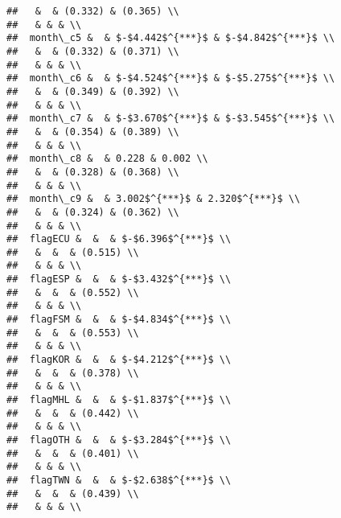 \documentclass[11pt,]{article}
\begin{document}
\begin{verbatim}
##   &  & (0.332) & (0.365) \\ 
##   & & & \\ 
##  month\_c5 &  & $-$4.442$^{***}$ & $-$4.842$^{***}$ \\ 
##   &  & (0.332) & (0.371) \\ 
##   & & & \\ 
##  month\_c6 &  & $-$4.524$^{***}$ & $-$5.275$^{***}$ \\ 
##   &  & (0.349) & (0.392) \\ 
##   & & & \\ 
##  month\_c7 &  & $-$3.670$^{***}$ & $-$3.545$^{***}$ \\ 
##   &  & (0.354) & (0.389) \\ 
##   & & & \\ 
##  month\_c8 &  & 0.228 & 0.002 \\ 
##   &  & (0.328) & (0.368) \\ 
##   & & & \\ 
##  month\_c9 &  & 3.002$^{***}$ & 2.320$^{***}$ \\ 
##   &  & (0.324) & (0.362) \\ 
##   & & & \\ 
##  flagECU &  &  & $-$6.396$^{***}$ \\ 
##   &  &  & (0.515) \\ 
##   & & & \\ 
##  flagESP &  &  & $-$3.432$^{***}$ \\ 
##   &  &  & (0.552) \\ 
##   & & & \\ 
##  flagFSM &  &  & $-$4.834$^{***}$ \\ 
##   &  &  & (0.553) \\ 
##   & & & \\ 
##  flagKOR &  &  & $-$4.212$^{***}$ \\ 
##   &  &  & (0.378) \\ 
##   & & & \\ 
##  flagMHL &  &  & $-$1.837$^{***}$ \\ 
##   &  &  & (0.442) \\ 
##   & & & \\ 
##  flagOTH &  &  & $-$3.284$^{***}$ \\ 
##   &  &  & (0.401) \\ 
##   & & & \\ 
##  flagTWN &  &  & $-$2.638$^{***}$ \\ 
##   &  &  & (0.439) \\ 
##   & & & \\ 

\end{verbatim}
\end{document}
